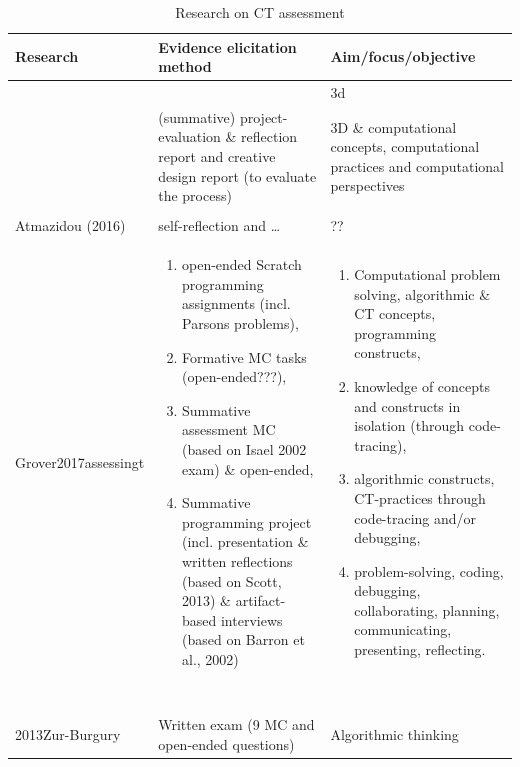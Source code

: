 \begin{table}
  \centering

\begin{tabular}{|p{60mm}|p{90mm}|p{90mm}|}
  \hline
   \textbf{Research} & \textbf{Evidence elicitation method} & \textbf{Aim/focus/objective} \\
  \hline
  \cite{BrennanResnick2012} &  & 3d  \\ \hline
  \cite{Zhong2016} &  (summative) project-evaluation \& reflection report and creative design report (to evaluate the process)  &  3D \& computational concepts, computational practices and computational perspectives \\ \hline
  \cite{LyeKoh2014} &   &   \\
  Atmazidou (2016) & self-reflection and \ldots  & ??  \\ \hline
  Grover2017assessingt & \begin{enumerate} \item open-ended Scratch programming assignments (incl. Parsons problems),\item Formative MC tasks (open-ended???), \item Summative assessment MC (based on Isael 2002 exam) \& open-ended, \item Summative programming project (incl. presentation \& written reflections (based on Scott, 2013) \& artifact-based interviews (based on Barron et al., 2002)\end{enumerate} & \begin{enumerate} \item Computational problem solving, algorithmic \& CT concepts, programming constructs, \item knowledge of concepts and constructs in isolation (through code-tracing), \item algorithmic constructs, CT-practices through code-tracing and/or debugging, \item problem-solving, coding, debugging, collaborating, planning, communicating, presenting, reflecting.\end{enumerate}\\ \hline
  \cite{bienkowski2015assessment} &   &   \\ \hline
  \cite{snow2017CTECD} &   &   \\ \hline

  \cite{Lonati2017Bebras} &   &   \\ \hline
  \cite{Seiter2013} &   &   \\ \hline
  \cite{Lee2011} &   &   \\ \hline
  2013Zur-Burgury & Written exam (9 MC and open-ended questions) & Algorithmic thinking\\
  \hline
\end{tabular}


\caption{Research on CT assessment}\label{table:CTassessmentResearch}
\end{table}


